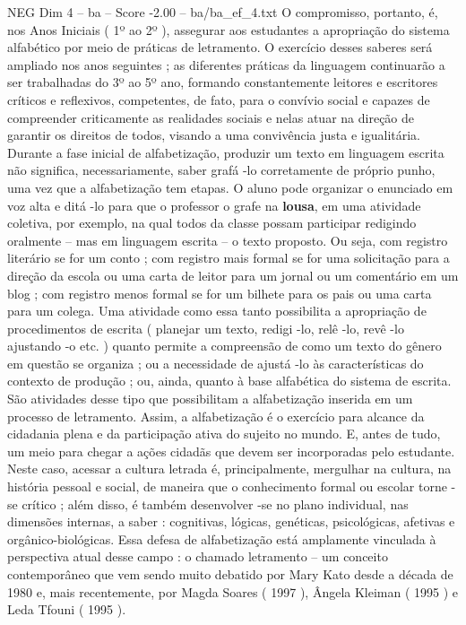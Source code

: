 \begin{textsample}{NEG Dim 4 – ba – Score -2.00 – ba/ba\_ef\_4.txt}
O compromisso, portanto, é, nos Anos Iniciais ( 1º ao 2º ), assegurar aos estudantes a apropriação do sistema alfabético por meio de práticas de letramento.
O exercício desses saberes será ampliado nos anos seguintes ; as diferentes práticas da linguagem continuarão a ser trabalhadas do 3º ao 5º ano, formando constantemente leitores e escritores críticos e reflexivos, competentes, de fato, para o convívio social e capazes de compreender criticamente as realidades sociais e nelas atuar na direção de garantir os direitos de todos, visando a uma convivência justa e igualitária.
Durante a fase inicial de alfabetização, produzir um texto em linguagem escrita não significa, necessariamente, saber grafá -lo corretamente de próprio punho, uma vez que a alfabetização tem etapas.
O aluno pode organizar o enunciado em voz alta e ditá -lo para que o professor o grafe na \textbf{lousa}, em uma atividade coletiva, por exemplo, na qual todos da classe possam participar redigindo oralmente – mas em linguagem escrita – o texto proposto.
Ou seja, com registro literário se for um conto ; com registro mais formal se for uma solicitação para a direção da escola ou uma carta de leitor para um jornal ou um comentário em um blog ; com registro menos formal se for um bilhete para os pais ou uma carta para um colega.
Uma atividade como essa tanto possibilita a apropriação de procedimentos de escrita ( planejar um texto, redigi -lo, relê -lo, revê -lo ajustando -o etc. ) quanto permite a compreensão de como um texto do gênero em questão se organiza ; ou a necessidade de ajustá -lo às características do contexto de produção ; ou, ainda, quanto à base alfabética do sistema de escrita.
São atividades desse tipo que possibilitam a alfabetização inserida em um processo de letramento.
Assim, a alfabetização é o exercício para alcance da cidadania plena e da participação ativa do sujeito no mundo.
E, antes de tudo, um meio para chegar a ações cidadãs que devem ser incorporadas pelo estudante.
Neste caso, acessar a cultura letrada é, principalmente, mergulhar na cultura, na história pessoal e social, de maneira que o conhecimento formal ou escolar torne -se crítico ; além disso, é também desenvolver -se no plano individual, nas dimensões internas, a saber : cognitivas, lógicas, genéticas, psicológicas, afetivas e orgânico-biológicas.
Essa defesa de alfabetização está amplamente vinculada à perspectiva atual desse campo : o chamado letramento – um conceito contemporâneo que vem sendo muito debatido por Mary Kato desde a década de 1980 e, mais recentemente, por Magda Soares ( 1997 ), Ângela Kleiman ( 1995 ) e Leda Tfouni ( 1995 ).

\end{textsample}
